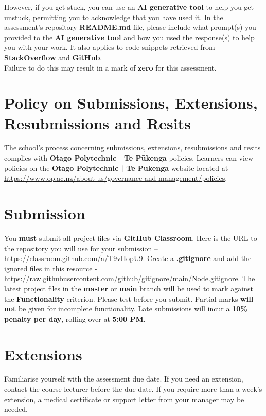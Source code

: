 \documentclass{article}
\begin{document}
 However, if you get stuck, you can use an \textbf{AI generative tool} to help you get unstuck, permitting you to acknowledge that you have used it. In the assessment's repository \textbf{README.md} file, please include what prompt(s) you provided to the \textbf{AI generative tool} and how you used the response(s) to help you with your work. It also applies to code snippets retrieved from \textbf{StackOverflow} and \textbf{GitHub}. \\
 
 Failure to do this may result in a mark of \textbf{zero} for this assessment.

\section*{Policy on Submissions, Extensions, Resubmissions and Resits}
The school's process concerning submissions, extensions, resubmissions and resits complies with \textbf{Otago Polytechnic | Te Pūkenga} policies. Learners can view policies on the \textbf{Otago Polytechnic | Te Pūkenga} website located at \href{https://www.op.ac.nz/about-us/governance-and-management/policies}{https://www.op.ac.nz/about-us/governance-and-management/policies}.

\section*{Submission}
You \textbf{must} submit all project files via \textbf{GitHub Classroom}. Here is the URL to the repository you will use for your submission – \href{https://classroom.github.com/a/T9vHopU9}{https://classroom.github.com/a/T9vHopU9}.  Create a \textbf{.gitignore} and add the ignored files in this resource - \href{https://raw.githubusercontent.com/github/gitignore/main/Node.gitignore}{https://raw.githubusercontent.com/github/gitignore/main/Node.gitignore}. The latest project files in the \textbf{master} or \textbf{main} branch will be used to mark against the \textbf{Functionality} criterion. Please test before you submit. Partial marks \textbf{will not} be given for incomplete functionality. Late submissions will incur a \textbf{10\% penalty per day}, rolling over at \textbf{5:00 PM}.

\section*{Extensions}
Familiarise yourself with the assessment due date. If you need an extension, contact the course lecturer before the due date. If you require more than a week's extension, a medical certificate or support letter from your manager may be needed.
\end{document}
